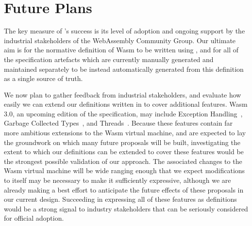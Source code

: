\section{Future Plans}
\label{sec:future}

The key measure of \dslname's success is its level of adoption and ongoing support by the industrial stakeholders of the WebAssembly Community Group.
%
Our ultimate aim is for the normative definition of Wasm to be written using \dslname, and for all of the specification artefacts which are currently manually generated and maintained separately to be instead automatically generated from this \dslname definition as a single source of truth.


We now plan to gather feedback from industrial stakeholders, and evaluate how easily we can extend our definitions written in \dslname to cover additional features.
Wasm 3.0, an upcoming edition of the specification, may include Exception Handling~\cite{wasm-exc}, Garbage Collected Types~\cite{wasm-gc}, and Threads~\cite{wasm-threads}.
Because these features contain far more ambitious extensions to the Wasm virtual machine,
and are expected to lay the groundwork on which many future proposals will be built,
investigating the extent to which our \dslname definitions can be extended to cover these features would be the strongest possible validation of our approach.
%
The associated changes to the Wasm virtual machine will be wide ranging enough that we expect modifications to \dslname itself may be necessary to make it sufficiently expressive, although we are already making a best effort to anticipate the future effects of these proposals in our current design.
%
Succeeding in expressing all of these features as \dslname definitions would be a strong signal to industry stakeholders that \dslname can be seriously considered for official adoption.
